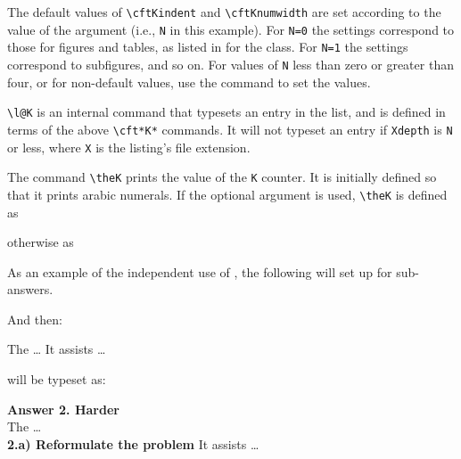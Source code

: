 The default values of \verb?\cftKindent? and \verb?\cftKnumwidth? are 
set according to the value of the  argument 
(i.e., \texttt{N} in this example). For \verb?N=0? the settings 
correspond to those for figures and tables, 
as listed in  for the  class.
For \verb?N=1? the settings correspond to subfigures, 
and so on. For values of \verb?N? less than zero or greater than four, 
or for non-default values, use the \cmd{\cftsetindents} command to 
set the values.

  \verb?\l@K? is an internal command that typesets an entry in the list, 
and is defined in terms of the above \verb?\cft*K*? commands. It will 
not typeset an entry if \verb?Xdepth? is \texttt{N} or less, where 
\texttt{X} is the listing's file extension.

 The command \verb?\theK? prints the value of the \texttt{K} counter. 
It is initially defined so that it prints arabic numerals. If the 
optional  argument is used, \verb?\theK? is defined as 
\begin{lcode}
 \renewcommand{\theK}{\thewithin.\arabic{K}}
\end{lcode}
 otherwise as
\begin{lcode}
\renewcommand{\theK}{\arabic{K}}
\end{lcode}

 As an example of the independent use of \cmd{\newlistentry}, the 
following will set up for sub-answers.
 \begin{lcode}
 \renewcommand{\thesubanswer}{\theanswer.\alph{subanswer}}
 \newcommand{\subanswer}[1]{
    \refstepcounter{subanswer}
    \par\textbf{\thesubanswer) #1}
    \addcontentsline{ans}{subanswer}{\protect\numberline{\thesubanswer}#1}
 \setcounter{ansdepth}{2}
 \end{lcode}
 And then:
 \begin{lcode}
  The \ldots
    It assists \ldots
 \end{lcode}
 will be typeset as:
\begin{syntax}
\textbf{Answer 2. Harder} \\
\hspace*{2em} The \ldots \\
\hspace*{2em} \textbf{2.a) Reformulate the problem} It assists \ldots \\
\end{syntax}

